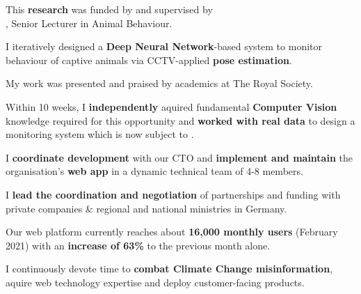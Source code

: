 \documentclass[]{jonas-cv}
\begin{document}
\begin{minipage}[t]{0.63\textwidth} 

\tinysectionsep

\sectionsep

\begin{tightemize}
    \item This \textbf{research} was funded by  and supervised by\\
    , Senior Lecturer in Animal Behaviour.
    \item I iteratively designed a \textbf{Deep Neural Network}-based system to 
    monitor behaviour of captive animals via CCTV-applied \textbf{pose estimation}.
    \item My work was presented and praised by academics at The Royal Society.
    \item [\angleDoubleRightSymbol] Within 10 weeks, I \textbf{independently} aquired fundamental \textbf{Computer Vision}
    knowledge required for this opportunity and \textbf{worked with real data} to design a 
    monitoring system which is now subject to 
    .
\end{tightemize}
\largesectionsep


\begin{tightemize}
    \item I \textbf{coordinate development} with our CTO and \textbf{implement and maintain} the organisation's \textbf{web app} in a dynamic technical team of 4-8 members.
    \item I \textbf{lead the coordination and negotiation} of partnerships and funding with private companies \& regional and national ministries in Germany.
    \item Our web platform currently reaches about \textbf{16,000 monthly users} (February 2021) with an \textbf{increase of 63\%} to the previous month alone.
    \item [\angleDoubleRightSymbol] I continuously devote time to \textbf{combat Climate Change misinformation}, aquire web technology expertise and deploy customer-facing products.
\end{tightemize}
\largesectionsep



\end{minipage}
\end{document}
